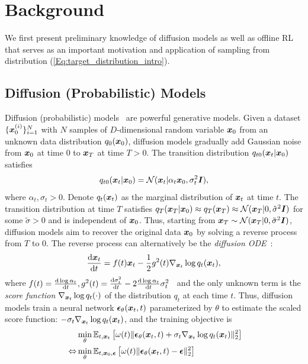 \section{Background}
We first present preliminary knowledge of diffusion models as well as offline RL that serves as an important motivation and application of sampling from distribution (\ref{Eq:target_distribution_intro}). 
\subsection{Diffusion (Probabilistic) Models}
Diffusion (probabilistic) models~\citep{sohl2015deep,ho2020denoising,song2020score} are powerful generative models. Given a dataset $\{{\bm{x}}_0^{(i)}\}_{i=1}^N$ with $N$ samples of $D$-dimensional random variable ${\bm{x}}_0$ from an unknown data distribution $q_0({\bm{x}}_0)$, diffusion models gradually add Gaussian noise from ${\bm{x}}_0$ at time $0$ to ${\bm{x}}_T$ at time $T > 0$. The transition distribution $q_{t0}({\bm{x}}_t|{\bm{x}}_0)$ satisfies
\begin{equation}
\label{Eq:forward_diffusion}
    q_{t0}({\bm{x}}_t|{\bm{x}}_0) = {\mathcal{N}}({\bm{x}}_t | \alpha_t{\bm{x}}_0, \sigma_t^2{\bm{I}}),
\end{equation}
where $\alpha_t,\sigma_t > 0$. Denote $q_t({\bm{x}}_t)$ as the marginal distribution of ${\bm{x}}_t$ at time $t$. The transition distribution at time $T$ satisfies $q_{T}({\bm{x}}_T|{\bm{x}}_0)\approx q_T({\bm{x}}_T) \approx {\mathcal{N}}({\bm{x}}_T | 0, \tilde\sigma^2{\bm{I}})$ for some $\tilde\sigma > 0$ and is independent of ${\bm{x}}_0$. Thus, starting from ${\bm{x}}_T \sim {\mathcal{N}}({\bm{x}}_T | 0, \tilde\sigma^2{\bm{I}})$, diffusion models aim to recover the original data ${\bm{x}}_0$ by solving a reverse process from $T$ to $0$. The reverse process can alternatively be the \textit{diffusion ODE}~\citep{song2020score}:
\begin{equation}
\label{Eq:diffusion_ode}
    \frac{\mathrm{d} {\bm{x}}_t}{\mathrm{d} t}=f(t){\bm{x}}_t-\frac{1}{2}g^2(t)\nabla_{{\bm{x}}_t}\log q_t({\bm{x}}_t),
\end{equation}
where $f(t)=\frac{\mathrm{d}\log \alpha_t}{\mathrm{d} t},g^2(t)=\frac{\mathrm{d} \sigma_t^2}{\mathrm{d} t}-2\frac{\mathrm{d}\log \alpha_t}{\mathrm{d} t}\sigma_t^2$~\citep{kingma2021variational} and the only unknown term is the \textit{score function} $\nabla_{{\bm{x}}_t}\log q_t(\cdot)$ of the distribution $q_t$ at each time $t$. Thus, diffusion models train a neural network $\bm{\epsilon}_\theta({\bm{x}}_t,t)$ parameterized by $\theta$ to estimate the scaled score function: $-\sigma_t\nabla_{{\bm{x}}_t}\log q_t({\bm{x}}_t)$, and the training objective is~\citep{ho2020denoising,song2020score}
\begin{equation}
\begin{aligned}
\label{Eq:diffusion_loss}
    \phantom{{}={}}&\min_\theta \E_{t,\x_t}\left[
        \omega(t)\|\epsilonv_\theta(\x_t,t) + \sigma_t\nabla_{\x_t}\log q_t(\x_t) \|_2^2
    \right]\\
    \Leftrightarrow &\min_\theta \E_{t,\x_0,\epsilonv}\left[
        \omega(t)\|\epsilonv_\theta(\x_t,t) - \epsilonv\|_2^2
    \right]
\end{aligned}
\end{equation}
